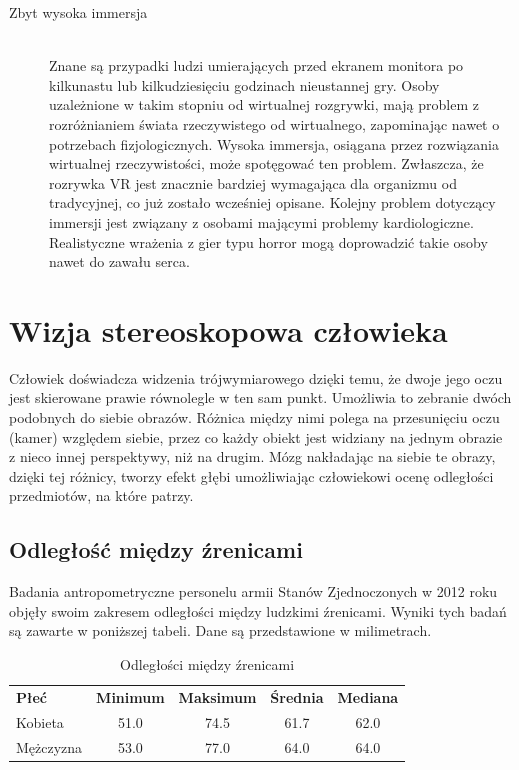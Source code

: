 \documentclass[a4paper,11pt,twoside]{report}
\theoremstyle{definition}
\begin{document}
\begin{description}
\item [Zbyt wysoka immersja] \hfill \\
Znane są przypadki ludzi umierających przed ekranem monitora po kilkunastu lub kilkudziesięciu godzinach nieustannej gry. Osoby uzależnione w takim stopniu od wirtualnej rozgrywki, mają problem z rozróżnianiem świata rzeczywistego od wirtualnego, zapominając nawet o potrzebach fizjologicznych. Wysoka immersja, osiągana przez rozwiązania wirtualnej rzeczywistości, może spotęgować ten problem. Zwłaszcza, że rozrywka VR jest znacznie bardziej wymagająca dla organizmu od tradycyjnej, co już zostało wcześniej opisane. 
Kolejny problem dotyczący immersji jest związany z osobami mającymi problemy kardiologiczne. Realistyczne wrażenia z gier typu horror mogą doprowadzić takie osoby nawet do zawału serca.
\end{description}

\section{Wizja stereoskopowa człowieka}

Człowiek doświadcza widzenia trójwymiarowego dzięki temu, że dwoje jego oczu jest skierowane prawie równolegle w ten sam punkt. Umożliwia to zebranie dwóch podobnych do siebie obrazów. Różnica między nimi polega na przesunięciu oczu (kamer) względem siebie, przez co każdy obiekt jest widziany na jednym obrazie z nieco innej perspektywy, niż na drugim. Mózg nakładając na siebie te obrazy, dzięki tej różnicy, tworzy efekt głębi umożliwiając człowiekowi ocenę odległości przedmiotów, na które patrzy.

\subsection{Odległość między źrenicami}

Badania antropometryczne personelu armii Stanów Zjednoczonych w 2012 roku\cite{IPdistance} objęły swoim zakresem odległości między ludzkimi źrenicami. Wyniki tych badań są zawarte w poniższej tabeli. Dane są przedstawione w milimetrach.

\begin{table}[h!]
\centering
\label{my-label}
\begin{tabular}{lcccc}
\textbf{Płeć} & \multicolumn{1}{l}{\textbf{Minimum}} & \multicolumn{1}{l}{\textbf{Maksimum}} & \multicolumn{1}{l}{\textbf{Średnia}} & \multicolumn{1}{l}{\textbf{Mediana}} \\
Kobieta       & 51.0                                 & 74.5                                  & 61.7                                 & 62.0                                 \\
Mężczyzna     & 53.0                                 & 77.0                                  & 64.0                                 & 64.0                                
\end{tabular}
\caption{Odległości między źrenicami}
\end{table}
\end{document}

